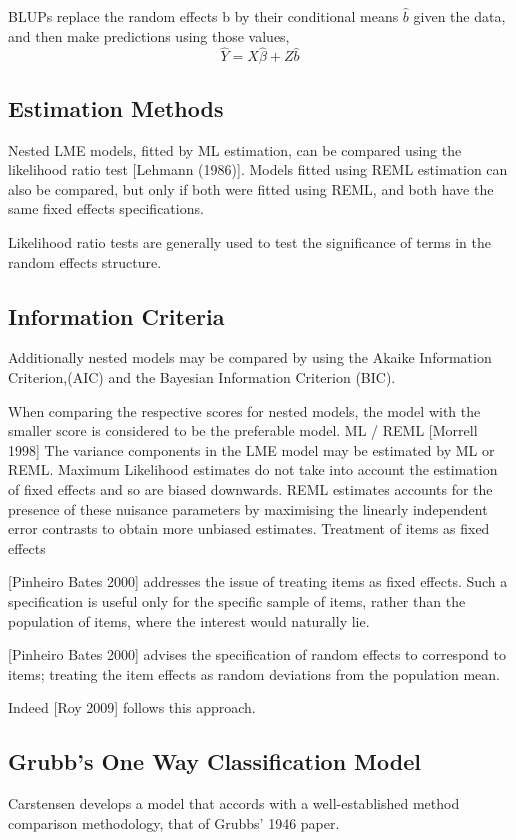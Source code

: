 \documentclass[Main.tex]{subfiles}
\begin{document}
BLUPs replace the random effects b by their conditional means $\hat{b}$ given the data, and then make
predictions using those values,
\[ \hat{Y} = X\hat{\beta}+ Z\hat{b}\]
\subsection{Estimation Methods}
Nested LME models, fitted by ML estimation, can be compared using the likelihood ratio test [Lehmann (1986)].
Models fitted using REML estimation can also be compared, but only if both were fitted using REML, and both have the same fixed effects specifications.

Likelihood ratio tests are generally used to test the significance of terms in the random effects structure.
\subsection{Information Criteria}
Additionally nested models may be compared by using the Akaike Information Criterion,(AIC) and the Bayesian Information Criterion (BIC).

When comparing the respective scores for nested models, the model with the smaller score is considered to be the preferable model.
ML / REML [Morrell 1998]
The variance components in the LME model may be estimated by ML or REML.
Maximum Likelihood estimates do not take into account the estimation of fixed effects and so
are biased downwards.
REML estimates accounts for the presence of these nuisance parameters by maximising the linearly independent error contrasts to obtain more unbiased estimates.
Treatment of items as fixed effects

[Pinheiro Bates 2000] addresses the issue of treating items as fixed effects. Such a specification is useful only for the specific sample of items, rather than the population of items, where the interest would naturally lie.

[Pinheiro Bates 2000] advises the specification of random effects to correspond to items; treating the item effects as random deviations from the population mean.

Indeed [Roy 2009] follows this approach.
\subsection{Grubb’s One Way Classification Model }
Carstensen develops a model that accords with a well-established method comparison methodology, that of Grubbs’ 1946 paper.
\end{document}
